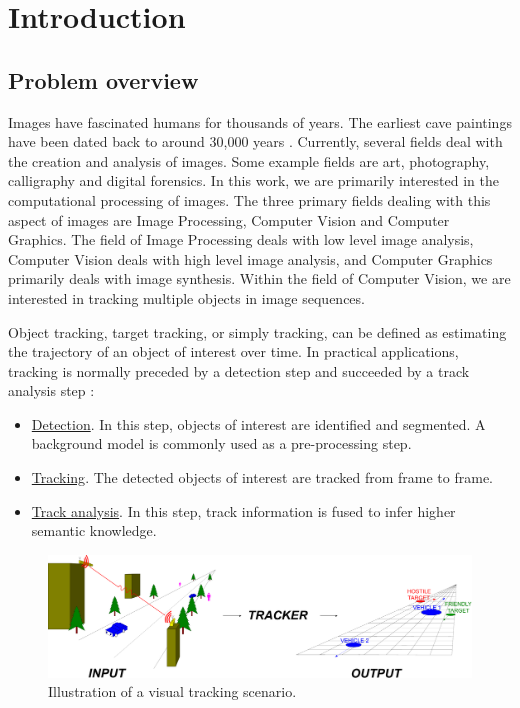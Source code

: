 \chapter{Introduction}
\label{chap_Introduction}	

\section{Problem overview}
Images have fascinated humans for thousands of years.  The earliest cave paintings have been dated back to around 30,000 years \cite{2009_WEB_EarliestHumanPaintings_Gray}.  Currently, several fields deal with the creation and analysis of images.  Some example fields are art, photography, calligraphy and digital forensics.  In this work, we are primarily interested in the computational processing of images.  The three primary fields dealing with this aspect of images are Image Processing, Computer Vision and Computer Graphics.  The field of Image Processing deals with low level image analysis, Computer Vision deals with high level image analysis, and Computer Graphics primarily deals with image synthesis.  Within the field of Computer Vision, we are interested in tracking multiple objects in image sequences.

Object tracking, target tracking, or simply tracking, can be defined as estimating the trajectory of an object of interest over time.  In practical applications, tracking is normally preceded by a detection step and succeeded by a track analysis step \cite{2006_JNL_SURVEYtrk_Yilmaz}:

\begin{itemize}
\item \underline{Detection}.  In this step, objects of interest are identified and segmented.  A background model is commonly used as a pre-processing step.
\item  \underline{Tracking}.  The detected objects of interest are tracked from frame to frame.  
\item  \underline{Track analysis}.  In this step, track information is fused to infer higher semantic knowledge.
\end{itemize}

\begin{figure}[t]
	\center
	\includegraphics[width=1.1\textwidth]{figs/TRK_overviewDiagram.pdf}
	\caption{Illustration of a visual tracking scenario.}
	\label{fig:TRK_illustration}
\end{figure}

